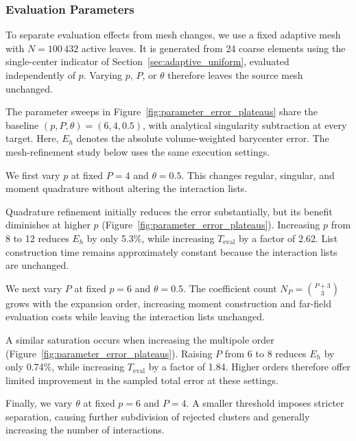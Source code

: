 \documentclass[a4paper,pdflatex,sn-mathphys-num]{sn-jnl}
\theoremstyle{thmstyleone}
\begin{document}
\subsubsection{Evaluation Parameters}
\label{sec:parameter_saturation}

To separate evaluation effects from mesh changes, we use a fixed adaptive mesh with $N=100\,432$ active leaves. It is generated from 24 coarse elements using the single-center indicator of Section~\ref{sec:adaptive_uniform}, evaluated independently of $p$. Varying $p$, $P$, or $\theta$ therefore leaves the source mesh unchanged.

The parameter sweeps in Figure~\ref{fig:parameter_error_plateaus} share the baseline $(p,P,\theta)=(6,4,0.5)$, with analytical singularity subtraction at every target. Here, $E_h$ denotes the absolute volume-weighted barycenter error. The mesh-refinement study below uses the same execution settings.

We first vary $p$ at fixed $P=4$ and $\theta=0.5$. This changes regular, singular, and moment quadrature without altering the interaction lists.

Quadrature refinement initially reduces the error substantially, but its benefit diminishes at higher $p$ (Figure~\ref{fig:parameter_error_plateaus}). Increasing $p$ from 8 to 12 reduces $E_h$ by only 5.3\%, while increasing $T_{\mathrm{eval}}$ by a factor of 2.62. List construction time remains approximately constant because the interaction lists are unchanged.

We next vary $P$ at fixed $p=6$ and $\theta=0.5$. The coefficient count $N_P=\binom{P+3}{3}$ grows with the expansion order, increasing moment construction and far-field evaluation costs while leaving the interaction lists unchanged.

A similar saturation occurs when increasing the multipole order (Figure~\ref{fig:parameter_error_plateaus}). Raising $P$ from 6 to 8 reduces $E_h$ by only 0.74\%, while increasing $T_{\mathrm{eval}}$ by a factor of 1.84. Higher orders therefore offer limited improvement in the sampled total error at these settings.

Finally, we vary $\theta$ at fixed $p=6$ and $P=4$. A smaller threshold imposes stricter separation, causing further subdivision of rejected clusters and generally increasing the number of interactions.
\end{document}
